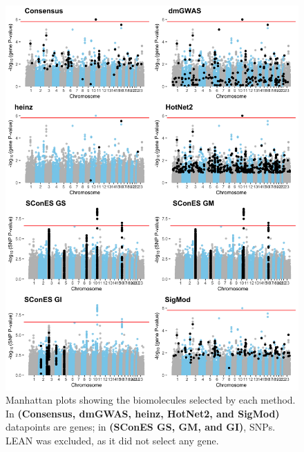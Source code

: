 \documentclass[twocolumn, 10pt]{article}
\begin{document}
\begin{figure}[htbp]
\centering
\includegraphics[width=.9\linewidth]{./figures/sfigure_3.png}
\caption{\label{sfig:manhattan_solutions}
Manhattan plots showing the biomolecules selected by each method. In \textbf{(Consensus, dmGWAS, heinz, HotNet2, and SigMod)} datapoints are genes; in \textbf{(SConES GS, GM, and GI)}, SNPs. LEAN was excluded, as it did not select any gene.}
\end{figure}
\end{document}
